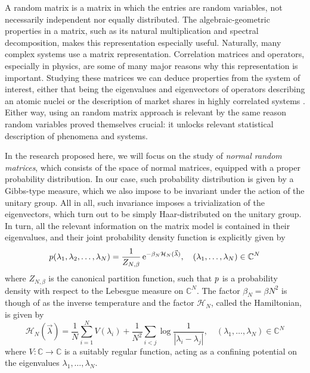 A random matrix is a matrix in which the entries are random variables, not necessarily independent nor equally distributed. The algebraic-geometric properties in a matrix, such as its natural multiplication and spectral decomposition, makes this representation especially useful. Naturally, many complex systems use a matrix representation. Correlation matrices and operators, especially in physics, are some of many major reasons why this representation is important. Studying these matrices we can deduce properties from the system of interest, either that being the eigenvalues and eigenvectors of operators describing an atomic nuclei \cite{Dyson} or the description of market shares in highly correlated systems \cite[Chapter~2]{fabozziquantitative}. Either way, using an random matrix approach is relevant by the same reason random variables proved themselves crucial: it unlocks relevant statistical description of phenomena and systems.

In the research proposed here, we will focus on the study of {\it normal random matrices}, which consists of the space of normal matrices, equipped with a proper probability distribution. In our case, such probability distribution is given by a Gibbs-type measure, which we also impose to be invariant under the action of the unitary group. All in all, such invariance imposes a trivialization of the eigenvectors, which turn out to be simply Haar-distributed on the unitary group. In turn, all the relevant information on the matrix model is contained in their eigenvalues, and their joint probability density function is explicitly given by
%
\begin{equation}
		p(\lambda_1, \lambda_2, \dots, \lambda_N) = \frac{1}{Z_{N, \beta}} \operatorname{e}^{-\beta_N \mathcal{H}_N(\vec{\lambda})},\quad (\lambda_1,\hdots,\lambda_N)\in \mathbb C^N
	\label{Equation: Gaussian measure}
\end{equation}
where $Z_{N, \beta}$ is the canonical partition function, such that $p$ is a probability density with respect to the Lebesgue measure on $\mathbb C^N$. The factor $\beta_N = \beta N^2$ is though of as the inverse temperature and the factor $\mathcal H_N$, called the Hamiltonian, is given by
%
$$\mathcal{H}_N(\vec{\lambda}) = \frac{1}{N}\sum_{i = 1}^{N} V(\lambda_i) + \frac{1}{N^2} \sum_{i < j} \log{\frac{1}{|\lambda_i - \lambda_j|}}, \quad (\lambda_1,\hdots,\lambda_N)\in \mathbb C^N$$
%
where $V:\mathbb C\to \mathbb C$ is a suitably regular function, acting as a confining potential on the eigenvalues $\lambda_1,\hdots, \lambda_N$. 

